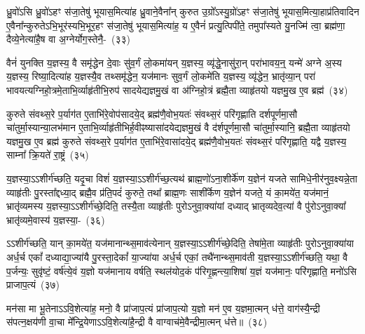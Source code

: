 {\anuvakamend[{उ॒क्थ्ये॑नोपा॒प्नोत्य॑गच्छतां॒ यः पु॑रो॒डाशं॑ च चत्वारि॒ꣳ॒शच्च॑}]}%

ध्रु॒वो॑\-ऽसि ध्रु॒वो॑\-ऽहꣳ स॑जा॒तेषु॑ भूयास॒मित्या॑ह ध्रु॒वाने॒वैना᳚न् कुरुत उ॒ग्रो᳚\-ऽस्यु॒ग्रो॑\-ऽहꣳ स॑जा॒तेषु॑ भूयास॒मित्या॒हाप्र॑तिवादिन ए॒वैना᳚न्कुरुते\-ऽभि॒भूर॑स्यभि॒भूर॒हꣳ स॑जा॒तेषु॑ भूयास॒मित्या॑ह॒ य ए॒वैनं॑ प्रत्यु॒त्पिपी॑ते॒ तमुपा᳚स्यते यु॒नज्मि॑ त्वा॒ ब्रह्म॑णा॒ दैव्ये॒नेत्या॑है॒ष वा अ॒ग्नेर्योग॒स्तेनै॒-~(३३)

वैनं॑ युनक्ति य॒ज्ञस्य॒ वै समृ॑द्धेन दे॒वाः सु॑व॒र्गं लो॒कमा॑यन् य॒ज्ञस्य॒ व्यृ॑द्धे॒नासु॑रा॒न् परा॑भावय॒न्॒ यन्मे॑ अग्ने अ॒स्य य॒ज्ञस्य॒ रिष्या॒दित्या॑ह य॒ज्ञस्यै॒व तथ्समृ॑द्धेन॒ यज॑मानः सुव॒र्गं लो॒कमे॑ति य॒ज्ञस्य॒ व्यृ॑द्धेन॒ भ्रातृ॑व्या॒न् परा॑ भावयत्यग्नि\-हो॒त्रमे॒ताभि॒र्व्याहृ॑तीभि॒\-रुप॑ सादयेद्यज्ञमु॒खं वा अ॑ग्निहो॒त्रं ब्रह्मै॒ता व्याहृ॑तयो यज्ञमु॒ख ए॒व ब्रह्म॑~(३४)

कुरुते संवथ्स॒रे प॒र्याग॑त ए॒ताभि॑रे॒वोप॑सादये॒द् ब्रह्म॑णै॒वोभ॒यतः॑ संवथ्स॒रं परि॑गृह्णाति दर्\mbox{}श\-पूर्ण\-मा॒सौ चा॑तुर्मा॒स्यान्या॒लभ॑मान ए॒ताभि॒र्व्याहृ॑तीभिर्\mbox{}ह॒वीꣴष्यासा॑द\-येद्यज्ञमु॒खं वै द॑र्\mbox{}शपूर्णमा॒सौ चा॑तुर्मा॒स्यानि॒ ब्रह्मै॒ता व्याहृ॑तयो यज्ञमु॒ख ए॒व ब्रह्म॑ कुरुते संवथ्स॒रे प॒र्याग॑त ए॒ताभि॑रे॒वासा॑द\-ये॒द् ब्रह्म॑णै॒वोभ॒यतः॑ संवथ्स॒रं परि॑गृह्णाति॒ यद्वै य॒ज्ञस्य॒ साम्ना᳚ क्रि॒यते॑ रा॒ष्ट्रं~(३५)

य॒ज्ञस्या॒\-ऽ\-ऽशीर्ग॑च्छति॒ यदृ॒चा विशं॑ य॒ज्ञस्या॒\-ऽ\-ऽशीर्ग॑च्छ॒त्यथ॑ ब्राह्म॒णो॑\-ऽना॒शीर्के॑ण य॒ज्ञेन॑ यजते सामिधे॒नीर॑नुव॒क्ष्यन्ने॒ता व्याहृ॑तीः पु॒रस्ता᳚द्दध्या॒द् ब्रह्मै॒व प्र॑ति॒पदं॑ कुरुते॒ तथा᳚ ब्राह्म॒णः साशी᳚र्केण य॒ज्ञेन॑ यजते॒ यं का॒मये॑त॒ यज॑मानं॒ भ्रातृ॑व्यमस्य य॒ज्ञस्या॒\-ऽ\-ऽशीर्ग॑च्छे॒दिति॒ तस्यै॒ता व्याहृ॑तीः पुरो\-ऽनुवा॒क्या॑यां दध्याद् भ्रातृव्यदेव॒त्या॑ वै पु॑रो\-ऽनुवा॒क्या᳚ भ्रातृ॑व्यमे॒वास्य॑ य॒ज्ञस्या॒-~(३६)

ऽऽशीर्ग॑च्छति॒ यान् का॒मये॑त॒ यज॑मानान्थ्स॒माव॑त्येनान् य॒ज्ञस्या॒\-ऽ\-ऽशीर्ग॑च्छे॒दिति॒ तेषा॑मे॒ता व्याहृ॑तीः पुरो\-ऽनुवा॒क्या॑या अर्ध॒र्च एकां᳚ दध्याद्या॒ज्या॑यै पु॒रस्ता॒देकां᳚ या॒ज्या॑या अर्ध॒र्च एकां॒ तथै॑नान्थ्स॒माव॑ती य॒ज्ञस्या॒\-ऽ\-ऽशीर्ग॑च्छति॒ यथा॒ वै प॒र्जन्यः॒ सुवृ॑ष्टं॒ वर्\mbox{}ष॑त्ये॒वं य॒ज्ञो यज॑मानाय वर्\mbox{}षति॒ स्थल॑योद॒कं प॑रिगृ॒ह्णन्त्या॒शिषा॑ य॒ज्ञं यज॑मानः॒ परि॑गृह्णाति॒ मनो॑\-ऽसि प्राजाप॒त्यं~(३७)

मन॑सा मा भू॒तेना\-ऽ\-ऽवि॒शेत्या॑ह॒ मनो॒ वै प्रा॑जाप॒त्यं प्रा॑जाप॒त्यो य॒ज्ञो मन॑ ए॒व य॒ज्ञमा॒त्मन् ध॑त्ते॒ वाग॑स्यै॒न्द्री स॑पत्न॒क्षय॑णी वा॒चा मे᳚न्द्रि॒येणा\-ऽ\-ऽवि॒शेत्या॑है॒न्द्री वै वाग्वाच॑मे॒वैन्द्रीमा॒त्मन् ध॑त्ते॥~(३८)

